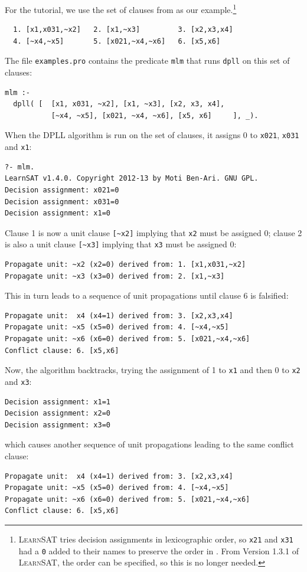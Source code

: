 \documentclass[11pt]{report}
\newcommand*{\p}[1]{\textup{\texttt{#1}}}
\newcommand*{\ls}{\textsc{LearnSAT}}
\begin{document}
For the tutorial, we use the set of clauses from \cite{mlm} as our
example.\footnote{\ls{} tries decision assignments in lexicographic
order, so \p{x21} and \p{x31} had a \p{0} added to their names to
preserve the order in \cite{mlm}. From Version 1.3.1 of \ls{}, the order
can be specified, so this is no longer needed.}

\begin{verbatim}
  1. [x1,x031,~x2]   2. [x1,~x3]         3. [x2,x3,x4]
  4. [~x4,~x5]       5. [x021,~x4,~x6]   6. [x5,x6]
\end{verbatim}

The file \p{examples.pro} contains the predicate \p{mlm} that runs
\p{dpll} on this set of clauses:

\begin{verbatim}
mlm :-
  dpll( [  [x1, x031, ~x2], [x1, ~x3], [x2, x3, x4],
           [~x4, ~x5], [x021, ~x4, ~x6], [x5, x6]     ], _).
\end{verbatim}

When the DPLL algorithm is run on the set of clauses, it assigns
0 to \p{x021}, \p{x031} and \p{x1}:

\begin{verbatim}
?- mlm.
LearnSAT v1.4.0. Copyright 2012-13 by Moti Ben-Ari. GNU GPL.
Decision assignment: x021=0
Decision assignment: x031=0
Decision assignment: x1=0
\end{verbatim}

Clause 1 is now a unit clause \verb+[~x2]+ implying that \p{x2} must be
assigned 0; clause 2 is also a unit clause \verb+[~x3]+ implying that
\p{x3} must be assigned 0:

\begin{verbatim}
Propagate unit: ~x2 (x2=0) derived from: 1. [x1,x031,~x2]
Propagate unit: ~x3 (x3=0) derived from: 2. [x1,~x3]
\end{verbatim}

This in turn leads to a sequence of unit propagations until clause 6
is falsified:

\begin{verbatim}
Propagate unit:  x4 (x4=1) derived from: 3. [x2,x3,x4]
Propagate unit: ~x5 (x5=0) derived from: 4. [~x4,~x5]
Propagate unit: ~x6 (x6=0) derived from: 5. [x021,~x4,~x6]
Conflict clause: 6. [x5,x6]
\end{verbatim}

Now, the algorithm backtracks, trying the assignment of 1 to \p{x1} and
then 0 to \p{x2} and \p{x3}:
\begin{verbatim}
Decision assignment: x1=1
Decision assignment: x2=0
Decision assignment: x3=0
\end{verbatim}
which causes another sequence of unit propagations leading to the same
conflict clause:
\begin{verbatim}
Propagate unit:  x4 (x4=1) derived from: 3. [x2,x3,x4]
Propagate unit: ~x5 (x5=0) derived from: 4. [~x4,~x5]
Propagate unit: ~x6 (x6=0) derived from: 5. [x021,~x4,~x6]
Conflict clause: 6. [x5,x6]
\end{verbatim}
\end{document}
